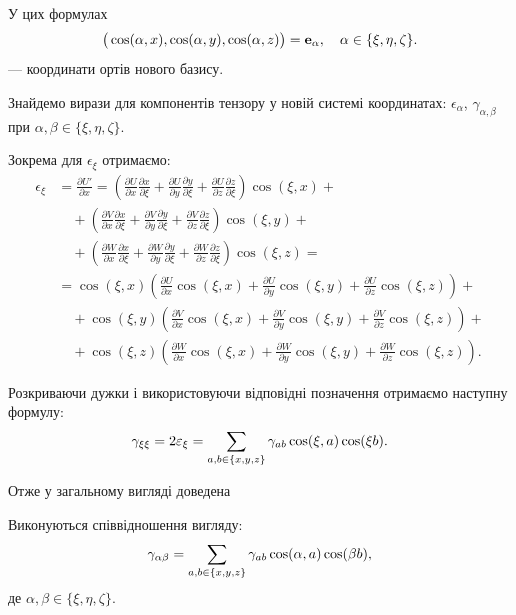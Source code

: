 У цих формулах 
\begin{equation}
	\big( \cos (\alpha, x), \cos (\alpha, y), \cos (\alpha, z) \big) = \bf{e}_\alpha, \quad \alpha \in \{\xi, \eta, \zeta\}.
\end{equation}
--- координати ортів нового базису. \medskip

Знайдемо вирази для компонентів тензору у новій системі координатах: $\epsilon_\alpha$, $\gamma_{\alpha, \beta}$ при $\alpha, \beta \in \{\xi, \eta, \zeta\}$. \medskip

Зокрема для $\epsilon_\xi$ отримаємо:
\begin{equation}
	\begin{aligned}
		\epsilon_\xi &= \frac{\partial U'}{\partial x} = \left( \frac{\partial U}{\partial x} \frac{\partial x}{\partial \xi} + \frac{\partial U}{\partial y} \frac{\partial y}{\partial \xi} + \frac{\partial U}{\partial z} \frac{\partial z}{\partial \xi}\right) \cos (\xi, x) + \\
		& \quad + \left( \frac{\partial V}{\partial x} \frac{\partial x}{\partial \xi} + \frac{\partial V}{\partial y} \frac{\partial y}{\partial \xi} + \frac{\partial V}{\partial z} \frac{\partial z}{\partial \xi}\right) \cos (\xi, y) + \\
		& \quad + \left( \frac{\partial W}{\partial x} \frac{\partial x}{\partial \xi} + \frac{\partial W}{\partial y} \frac{\partial y}{\partial \xi} + \frac{\partial W}{\partial z} \frac{\partial z}{\partial \xi}\right) \cos (\xi, z) = \\
		&= \cos (\xi, x) \left( \frac{\partial U}{\partial x} \cos (\xi, x) + \frac{\partial U}{\partial y} \cos (\xi, y) + \frac{\partial U}{\partial z} \cos (\xi, z)\right) + \\
		&\quad + \cos (\xi, y) \left( \frac{\partial V}{\partial x} \cos (\xi, x) + \frac{\partial V}{\partial y} \cos (\xi, y) + \frac{\partial V}{\partial z} \cos (\xi, z)\right) + \\
		&\quad + \cos (\xi, z) \left( \frac{\partial W}{\partial x} \cos (\xi, x) + \frac{\partial W}{\partial y} \cos (\xi, y) + \frac{\partial W}{\partial z} \cos (\xi, z)\right).
	\end{aligned}
\end{equation}
     
Розкриваючи дужки і використовуючи відповідні позначення отримаємо наступну формулу:
\begin{equation}
	\gamma_{\xi \xi} = 2 \epsilon_\xi  = \Sum_{a, b \in \{x, y, z\}} \gamma_{a b} \cos (\xi, a) \cos(\xi b).
\end{equation}

Отже у загальному вигляді доведена
\begin{theorem}
	Виконуються співвідношення вигляду:
	\begin{equation}
		\gamma_{\alpha \beta} = \Sum_{a, b \in \{x, y, z\}} \gamma_{a b} \cos (\alpha, a) \cos(\beta b),
	\end{equation}
	де $\alpha, \beta \in \{\xi, \eta, \zeta\}$.
\end{theorem}

% 